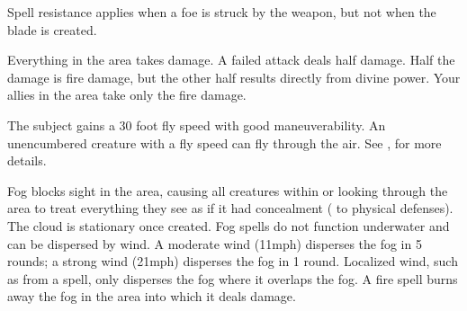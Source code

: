 Spell resistance applies when a foe is struck by the weapon, but not when the blade is created.

\spelleffect Everything in the area takes damage. A failed attack deals half damage. Half the damage is fire damage, but the other half results directly from divine power. Your allies in the area take only the fire damage.
\spellnotes \destructivespellnotes

\firespellnotes
{}

\spelldur{\durshort}
\spelleffect The subject gains a 30 foot fly speed with good maneuverability.
\spellnotes An unencumbered creature with a fly speed can fly through the air. See , for more details.

\spelldur{\durshort}
\spelleffect Fog blocks sight in the area, causing all creatures within or looking through the area to treat everything they see as if it had concealment ( to physical defenses). The cloud is stationary once created.
\spellnotes Fog spells do not function underwater and can be dispersed by wind. A moderate wind (11\add mph) disperses the fog in 5 rounds; a strong wind (21\add mph) disperses the fog in 1 round. Localized wind, such as from a  spell, only disperses the fog where it overlaps the fog. A fire spell burns away the fog in the area into which it deals damage.

